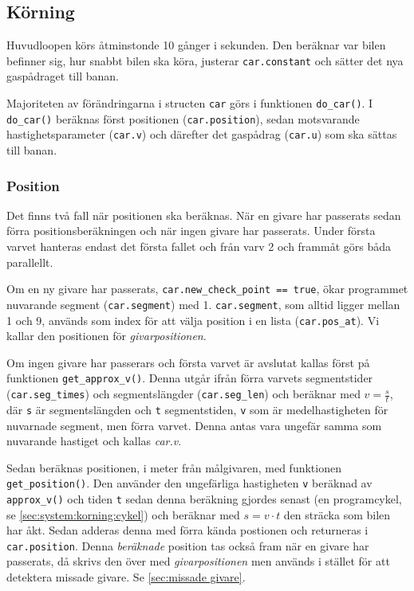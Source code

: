 \subsection{Körning}
\label{sec:systembeskrivning:korning}

Huvudloopen körs åtminstonde 10 gånger i sekunden. Den beräknar var bilen
befinner sig, hur snabbt bilen ska köra, justerar \texttt{car.constant} och sätter det
nya gaspådraget till banan.

Majoriteten av förändringarna i structen \texttt{car} görs i funktionen \texttt{do\_car()}. 
I \texttt{do\_car()} beräknas  först positionen (\texttt{car.position}), 
sedan motsvarande hastighetsparameter (\texttt{car.v}) och därefter det gaspådrag 
(\texttt{car.u}) som ska sättas till banan.

\subsubsection{Position}
\label{sec:system:korning:position}
Det finns två fall när positionen ska beräknas. När en givare har passerats sedan förra positionsberäkningen och när ingen givare har passerats. Under första varvet hanteras endast det första fallet
och från varv 2 och frammåt görs båda parallellt. 

Om en ny givare har passerats, \texttt{car.new\_check\_point == true}, ökar
programmet nuvarande segment (\texttt{car.segment}) med 1. \texttt{car.segment}, som
alltid ligger mellan 1 och 9, används som index för att välja position i en
lista (\texttt{car.pos\_at}). Vi kallar den positionen för \emph{givarpositionen}.

Om ingen givare har passerars och första varvet är avslutat kallas först på funktionen \texttt{get\_approx\_v()}. Denna utgår ifrån
förra varvets segmentstider (\texttt{car.seg\_times}) och segmentslängder
(\texttt{car.seg\_len}) och beräknar med $v = \frac{s}{t}$, där \texttt{s} är segmentslängden och \texttt{t} segmentstiden, \texttt{v} som är medelhastigheten för nuvarnade
segment, men förra varvet. Denna antas vara ungefär samma som nuvarande
hastiget och kallas \emph{car.v}. 

Sedan beräknas positionen, i meter från målgivaren, med funktionen
\texttt{get\_position()}. Den använder den ungefärliga hastigheten \texttt{v} beräknad av
\texttt{approx\_v()} och tiden \texttt{t} sedan denna beräkning gjordes senast (en programcykel, se \ref{sec:system:korning:cykel})
och beräknar med $s = v \cdot t$ den sträcka som bilen har åkt. Sedan adderas denna
med förra kända postionen och returneras i \texttt{car.position}. Denna 
\emph{beräknade} position tas också fram när en givare har passerats, då skrivs den över med \emph{givarpositionen} men används i stället för att detektera missade givare. Se \ref{sec:missade givare}.

